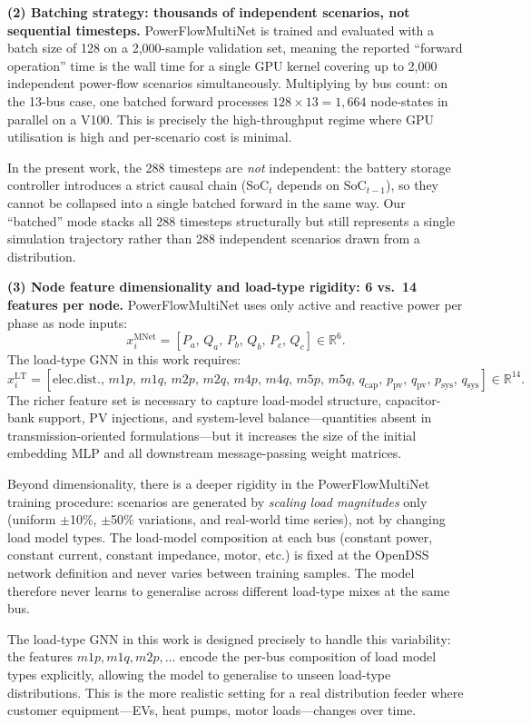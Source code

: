 \documentclass[11pt]{article}
\begin{document}
\textbf{(2) Batching strategy: thousands of independent scenarios, not sequential timesteps.}
PowerFlowMultiNet is trained and evaluated with a batch size of 128 on
a 2,000-sample validation set, meaning the reported ``forward operation'' time
is the wall time for a single GPU kernel covering up to 2,000 independent
power-flow scenarios simultaneously.  Multiplying by bus count: on the 13-bus
case, one batched forward processes $128 \times 13 = 1{,}664$ node-states in
parallel on a V100.  This is precisely the high-throughput regime where GPU
utilisation is high and per-scenario cost is minimal.

In the present work, the 288 timesteps are \emph{not} independent:
the battery storage controller introduces a strict causal chain
($\text{SoC}_{t}$ depends on $\text{SoC}_{t-1}$), so they cannot be collapsed
into a single batched forward in the same way.  Our ``batched'' mode stacks
all 288 timesteps structurally but still represents a single simulation
trajectory rather than 288 independent scenarios drawn from a distribution.

\textbf{(3) Node feature dimensionality and load-type rigidity: 6 vs.\ 14 features per node.}
PowerFlowMultiNet uses only active and reactive power per phase as node
inputs:
\[
x_i^{\text{MNet}} = [P_a,\,Q_a,\,P_b,\,Q_b,\,P_c,\,Q_c] \in \mathbb{R}^6.
\]
The load-type GNN in this work requires:
\[
x_i^{\text{LT}} = [\text{elec.dist.},\,m1p,\,m1q,\,m2p,\,m2q,\,m4p,\,m4q,
                   \,m5p,\,m5q,\,q_\text{cap},\,p_\text{pv},\,q_\text{pv},
                   \,p_\text{sys},\,q_\text{sys}] \in \mathbb{R}^{14}.
\]
The richer feature set is necessary to capture load-model structure,
capacitor-bank support, PV injections, and system-level balance---quantities
absent in transmission-oriented formulations---but it increases the size of
the initial embedding MLP and all downstream message-passing weight matrices.

Beyond dimensionality, there is a deeper rigidity in the PowerFlowMultiNet
training procedure: scenarios are generated by \emph{scaling load magnitudes}
only (uniform $\pm$10\%, $\pm$50\% variations, and real-world time series),
not by changing load model types.  The load-model composition at each bus
(constant power, constant current, constant impedance, motor, etc.) is fixed
at the OpenDSS network definition and never varies between training samples.
The model therefore never learns to generalise across different load-type
mixes at the same bus.

The load-type GNN in this work is designed precisely to handle this
variability: the features $m1p, m1q, m2p, \ldots$ encode the per-bus
composition of load model types explicitly, allowing the model to generalise
to unseen load-type distributions.  This is the more realistic setting for
a real distribution feeder where customer equipment---EVs, heat pumps, motor
loads---changes over time.
\end{document}
